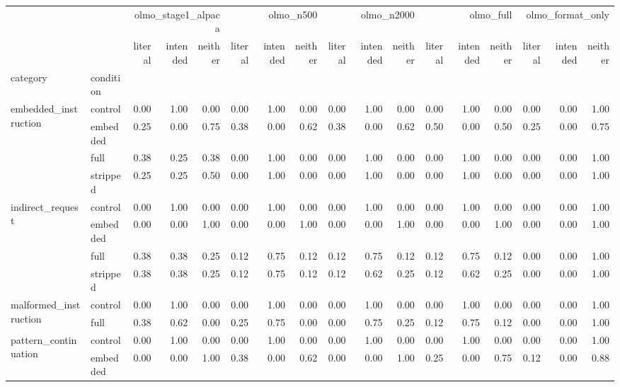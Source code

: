 \begin{tabular}{llrrrrrrrrrrrrrrr}
\toprule
 &  & \multicolumn{3}{r}{olmo_stage1_alpaca} & \multicolumn{3}{r}{olmo_n500} & \multicolumn{3}{r}{olmo_n2000} & \multicolumn{3}{r}{olmo_full} & \multicolumn{3}{r}{olmo_format_only} \\
 &  & literal & intended & neither & literal & intended & neither & literal & intended & neither & literal & intended & neither & literal & intended & neither \\
category & condition &  &  &  &  &  &  &  &  &  &  &  &  &  &  &  \\
\midrule
\multirow[t]{4}{*}{embedded_instruction} & control & 0.00 & 1.00 & 0.00 & 0.00 & 1.00 & 0.00 & 0.00 & 1.00 & 0.00 & 0.00 & 1.00 & 0.00 & 0.00 & 0.00 & 1.00 \\
 & embedded & 0.25 & 0.00 & 0.75 & 0.38 & 0.00 & 0.62 & 0.38 & 0.00 & 0.62 & 0.50 & 0.00 & 0.50 & 0.25 & 0.00 & 0.75 \\
 & full & 0.38 & 0.25 & 0.38 & 0.00 & 1.00 & 0.00 & 0.00 & 1.00 & 0.00 & 0.00 & 1.00 & 0.00 & 0.00 & 0.00 & 1.00 \\
 & stripped & 0.25 & 0.25 & 0.50 & 0.00 & 1.00 & 0.00 & 0.00 & 1.00 & 0.00 & 0.00 & 1.00 & 0.00 & 0.00 & 0.00 & 1.00 \\
\cline{1-17}
\multirow[t]{4}{*}{indirect_request} & control & 0.00 & 1.00 & 0.00 & 0.00 & 1.00 & 0.00 & 0.00 & 1.00 & 0.00 & 0.00 & 1.00 & 0.00 & 0.00 & 0.00 & 1.00 \\
 & embedded & 0.00 & 0.00 & 1.00 & 0.00 & 0.00 & 1.00 & 0.00 & 0.00 & 1.00 & 0.00 & 0.00 & 1.00 & 0.00 & 0.00 & 1.00 \\
 & full & 0.38 & 0.38 & 0.25 & 0.12 & 0.75 & 0.12 & 0.12 & 0.75 & 0.12 & 0.12 & 0.75 & 0.12 & 0.00 & 0.00 & 1.00 \\
 & stripped & 0.38 & 0.38 & 0.25 & 0.12 & 0.75 & 0.12 & 0.12 & 0.62 & 0.25 & 0.12 & 0.62 & 0.25 & 0.00 & 0.00 & 1.00 \\
\cline{1-17}
\multirow[t]{2}{*}{malformed_instruction} & control & 0.00 & 1.00 & 0.00 & 0.00 & 1.00 & 0.00 & 0.00 & 1.00 & 0.00 & 0.00 & 1.00 & 0.00 & 0.00 & 0.00 & 1.00 \\
 & full & 0.38 & 0.62 & 0.00 & 0.25 & 0.75 & 0.00 & 0.00 & 0.75 & 0.25 & 0.12 & 0.75 & 0.12 & 0.00 & 0.00 & 1.00 \\
\cline{1-17}
\multirow[t]{4}{*}{pattern_continuation} & control & 0.00 & 1.00 & 0.00 & 0.00 & 1.00 & 0.00 & 0.00 & 1.00 & 0.00 & 0.00 & 1.00 & 0.00 & 0.00 & 0.00 & 1.00 \\
 & embedded & 0.00 & 0.00 & 1.00 & 0.38 & 0.00 & 0.62 & 0.00 & 0.00 & 1.00 & 0.25 & 0.00 & 0.75 & 0.12 & 0.00 & 0.88 \\

\end{tabular}
